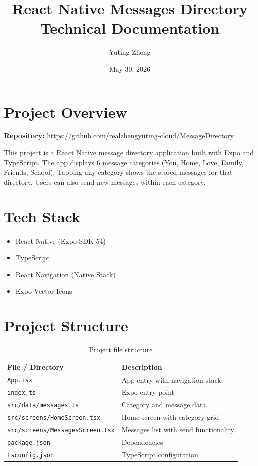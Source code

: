\documentclass[12pt,a4paper]{article}
\title{\textbf{React Native Messages Directory}\\[0.5em]\large Technical Documentation}
\author{Yuting Zheng}
\date{May 30, 2026}
\begin{document}
\maketitle
\thispagestyle{empty}

\vspace{1cm}
\tableofcontents
\newpage

\section{Project Overview}

\textbf{Repository:} \url{https://github.com/realzhengyuting-cloud/MessageDirectory}

\vspace{0.5em}

This project is a React Native message directory application built with Expo and TypeScript. The app displays 6 message categories (You, Home, Love, Family, Friends, School). Tapping any category shows the stored messages for that directory. Users can also send new messages within each category.

\section{Tech Stack}

\begin{itemize}
    \item React Native (Expo SDK 54)
    \item TypeScript
    \item React Navigation (Native Stack)
    \item Expo Vector Icons
\end{itemize}

\section{Project Structure}

\begin{table}[H]
\centering
\begin{tabular}{@{}ll@{}}
\toprule
\textbf{File / Directory} & \textbf{Description} \\
\midrule
\texttt{App.tsx} & App entry with navigation stack \\
\texttt{index.ts} & Expo entry point \\
\texttt{src/data/messages.ts} & Category and message data \\
\texttt{src/screens/HomeScreen.tsx} & Home screen with category grid \\
\texttt{src/screens/MessagesScreen.tsx} & Messages list with send functionality \\
\texttt{package.json} & Dependencies \\
\texttt{tsconfig.json} & TypeScript configuration \\
\bottomrule
\end{tabular}
\caption{Project file structure}
\end{table}
\end{document}
